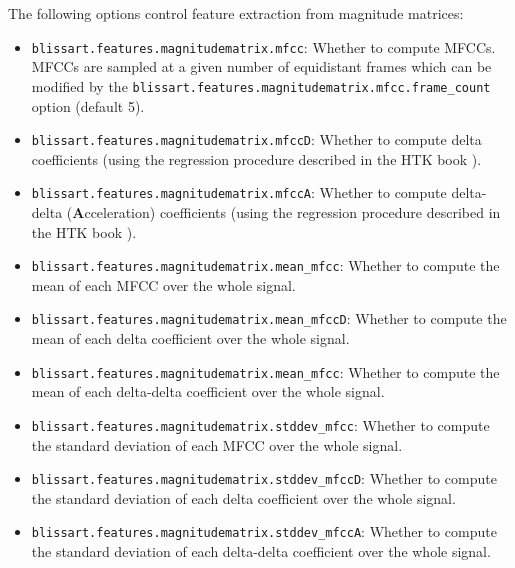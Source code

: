 The following options control feature extraction from magnitude matrices:
\begin{itemize}
  \item {\tt blissart.features.magnitudematrix.mfcc}: Whether to compute
    MFCCs. MFCCs are sampled at a given number of equidistant frames which can
    be modified by the {\tt blissart.features.magnitudematrix.mfcc.frame\_count}
    option (default 5).
  \item {\tt blissart.features.magnitudematrix.mfccD}: Whether to compute delta
    coefficients (using the regression procedure described in the HTK book
    \cite{HTKBook}).
  \item {\tt blissart.features.magnitudematrix.mfccA}: Whether to compute
    delta-delta ({\bf A}cceleration) coefficients (using the regression
    procedure described in the HTK book \cite{HTKBook}).
  \item {\tt blissart.features.magnitudematrix.mean\_mfcc}: Whether to compute
    the mean of each MFCC over the whole signal.
  \item {\tt blissart.features.magnitudematrix.mean\_mfccD}: Whether to compute
    the mean of each delta coefficient over the whole signal.
  \item {\tt blissart.features.magnitudematrix.mean\_mfcc}: Whether to compute
    the mean of each delta-delta coefficient over the whole signal.
  \item {\tt blissart.features.magnitudematrix.stddev\_mfcc}: Whether to compute
    the standard deviation of each MFCC over the whole signal.
  \item {\tt blissart.features.magnitudematrix.stddev\_mfccD}: Whether to
    compute the standard deviation of each delta coefficient over the whole
    signal.
  \item {\tt blissart.features.magnitudematrix.stddev\_mfccA}: Whether to
    compute the standard deviation of each delta-delta coefficient over the
    whole signal.
\end{itemize}



